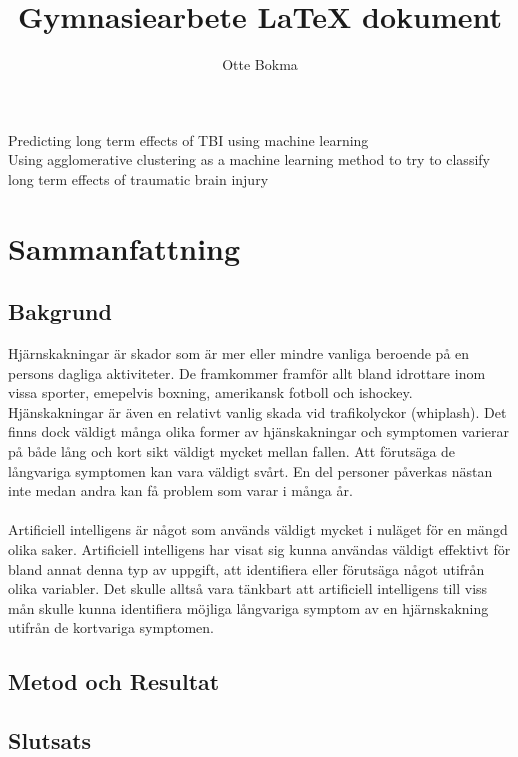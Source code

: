 \documentclass[11pt]{article}
\title{Gymnasiearbete {\LaTeX} dokument}
\author{Otte Bokma}
\begin{document}
\begin{titlepage}

  \begin{center}
    \huge{Predicting long term effects of TBI using machine learning}
    \\[1cm]
    \large{Using agglomerative clustering as a machine learning method to try to classify long term effects of traumatic brain injury}
  \end{center}
\end{titlepage}

\section*{Sammanfattning}

\subsection*{Bakgrund}

Hjärnskakningar är skador som är mer eller mindre vanliga beroende på en persons dagliga aktiviteter. De framkommer framför allt bland idrottare inom vissa sporter, emepelvis boxning, amerikansk fotboll och ishockey. Hjänskakningar är även en relativt vanlig skada vid trafikolyckor (whiplash). Det finns dock väldigt många olika former av hjänskakningar och symptomen varierar på både lång och kort sikt väldigt mycket mellan fallen. Att förutsäga de långvariga symptomen kan vara väldigt svårt. En del personer påverkas nästan inte medan andra kan få problem som varar i många år.\\
\\
Artificiell intelligens är något som används väldigt mycket i nuläget för en mängd olika saker. Artificiell intelligens har visat sig kunna användas väldigt effektivt för bland annat denna typ av uppgift, att identifiera eller förutsäga något utifrån olika variabler. Det skulle alltså vara tänkbart att artificiell intelligens till viss mån skulle kunna identifiera möjliga långvariga symptom av en hjärnskakning utifrån de kortvariga symptomen.

\subsection*{Metod och Resultat}

\subsection*{Slutsats}
\end{document}
